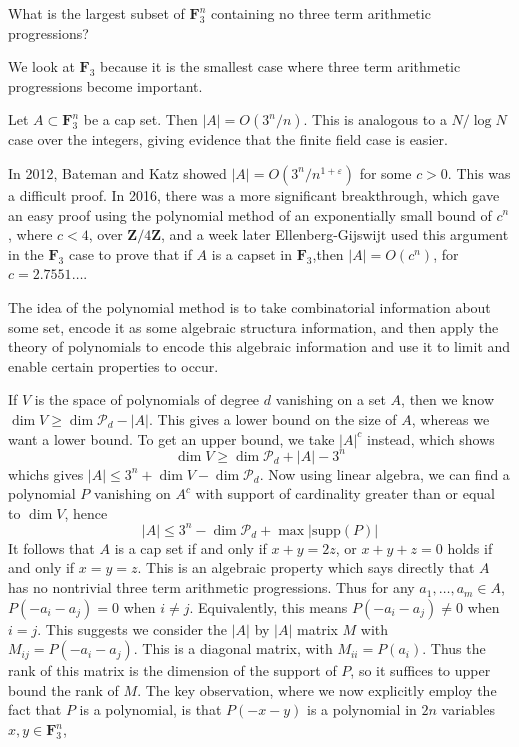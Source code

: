 \begin{theorem}
    What is the largest subset of $\mathbf{F}_3^n$ containing no three term arithmetic progressions?
\end{theorem}

We look at $\mathbf{F}_3$ because it is the smallest case where three term arithmetic progressions become important.

\begin{theorem}[Meschulam - 1995]
    Let $A \subset \mathbf{F}_3^n$ be a cap set. Then $|A| = O(3^n/n)$. This is analogous to a $N/\log N$ case over the integers, giving evidence that the finite field case is easier.
\end{theorem}

In 2012, Bateman and Katz showed $|A| = O(3^n/n^{1 + \varepsilon})$ for some $c > 0$. This was a difficult proof. In 2016, there was a more significant breakthrough, which gave an easy proof using the polynomial method of an exponentially small bound of $c^n$, where $c < 4$, over $\mathbf{Z}/4\mathbf{Z}$, and a week later Ellenberg-Gijswijt used this argument in the $\mathbf{F}_3$ case to prove that if $A$ is a capset in $\mathbf{F}_3$,then $|A| = O(c^n)$, for $c = 2.7551\dots$.

The idea of the polynomial method is to take combinatorial information about some set, encode it as some algebraic structura information, and then apply the theory of polynomials to encode this algebraic information and use it to limit and enable certain properties to occur.

If $V$ is the space of polynomials of degree $d$ vanishing on a set $A$, then we know $\dim V \geq \dim \mathcal{P}_d - |A|$. This gives a lower bound on the size of $A$, whereas we want a lower bound. To get an upper bound, we take $|A|^c$ instead, which shows
%
\[ \dim V \geq \dim \mathcal{P}_d + |A| - 3^n \]
%
whichs gives $|A| \leq 3^n + \dim V - \dim \mathcal{P}_d$. Now using linear algebra, we can find a polynomial $P$ vanishing on $A^c$ with support of cardinality greater than or equal to $\dim V$, hence
%
\[ |A| \leq 3^n - \dim \mathcal{P}_d + \max |\text{supp}(P)| \]
%
It follows that $A$ is a cap set if and only if $x + y = 2z$, or $x + y + z = 0$ holds if and only if $x = y = z$. This is an algebraic property which says directly that $A$ has no nontrivial three term arithmetic progressions. Thus for any $a_1, \dots, a_m \in A$, $P(-a_i-a_j) = 0$ when $i \neq j$. Equivalently, this means $P(-a_i-a_j) \neq 0$ when $i = j$. This suggests we consider the $|A|$ by $|A|$ matrix $M$ with $M_{ij} = P(-a_i-a_j)$. This is a diagonal matrix, with $M_{ii} = P(a_i)$. Thus the rank of this matrix is the dimension of the support of $P$, so it suffices to upper bound the rank of $M$. The key observation, where we now explicitly employ the fact that $P$ is a polynomial, is that $P(-x-y)$ is a polynomial in $2n$ variables $x,y \in \mathbf{F}_3^n$,

\begin{thebibliography}{9}

\end{thebibliography}

